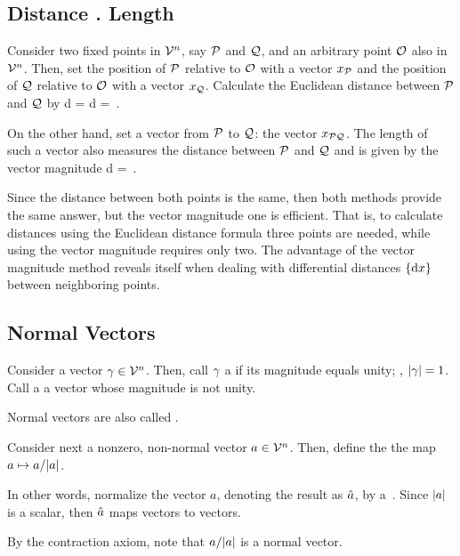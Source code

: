 \subsection{Distance \vs. Length}
Consider two fixed points in $\mathcal{V}^{n}$, say $\mathcal{P}$ and $\mathcal{Q}$, and an arbitrary point $\mathcal{O}$ also in $\mathcal{V}^{n}$. Then, set the position of $\mathcal{P}$ relative to $\mathcal{O}$ with a vector $x_{\mathcal{P}}$ and the position of $\mathcal{Q}$ relative to $\mathcal{O}$ with a vector $x_{\mathcal{Q}}$. Calculate the Euclidean distance between $\mathcal{P}$ and $\mathcal{Q}$ by
\beq
d = d =  \,.
\eeq

On the other hand, set a vector from $\mathcal{P}$ to $\mathcal{Q}$: the vector $x_{\mathcal{PQ}}$. The length of such a vector also measures the distance between $\mathcal{P}$ and $\mathcal{Q}$ and is given by the vector magnitude
\beq
d = \,.
\eeq

Since the distance between both points is the same, then both methods provide the same answer, but the vector magnitude one is efficient. That is, to calculate distances using the Euclidean distance formula three points are needed, while using the vector magnitude requires only two. The advantage of the vector magnitude method reveals itself when dealing with differential distances $\left\lbrace{\text{d}x}\right\rbrace$ between neighboring points.


\subsection{Normal Vectors}
Consider a vector $\gamma\in\mathcal{V}^{n}$. Then, call $\gamma$ a  if its magnitude equals unity; \ie, $\lvert{\gamma}\rvert = 1$. Call a  a vector whose magnitude is not unity.

Normal vectors are also called .

Consider next a nonzero, non-normal vector $a\in\mathcal{V}^{n}$. Then, define the  the map $a\mapsto a/\lvert{a}\rvert$.

In other words, normalize the vector $a$, denoting the result as $\hat{a}$, by
\beq
\nvec a  {}\,.
\eeq
Since $\lvert{a}\rvert$ is a scalar, then $\hat{a}$ maps vectors to vectors.

By the contraction axiom, note that $a/\lvert{a}\rvert$ is a normal vector.


